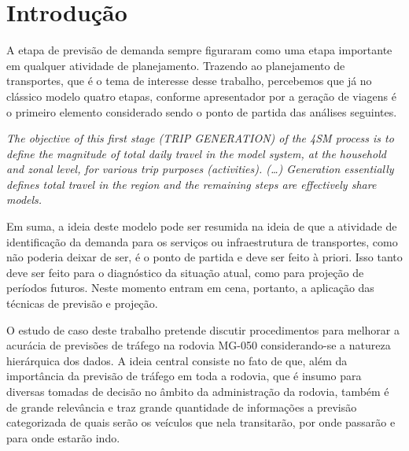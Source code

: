 \documentclass[
	12pt,				%
	openright,			%
	twoside,			%
	a4paper,			%
	english,			%
	french,				%
	spanish,			%
	brazil				%
	]{abntex2}
\begin{document}
\tableofcontents*
\cleardoublepage



\textual

\chapter*[Introdução]{Introdução}

A etapa de previsão de demanda sempre figuraram como uma etapa importante em qualquer atividade de planejamento.
Trazendo ao planejamento de transportes, que é o tema de interesse desse trabalho, percebemos que já no clássico modelo quatro etapas, conforme apresentador por  a geração de viagens é o primeiro elemento considerado sendo o ponto de partida das análises seguintes.

\begin{citacao}
\emph{The objective of this first stage (TRIP GENERATION) of the 4SM process is to define the magnitude of total daily travel in the model system, at the household and zonal level, for various trip purposes (activities). (…) Generation essentially defines total travel in the region and the remaining steps are effectively share models.} \cite{hensher_handbook_2007}
\end{citacao}
 
Em suma, a ideia deste modelo pode ser resumida na ideia de que a atividade de identificação da demanda para os serviços ou infraestrutura de transportes, como não poderia deixar de ser, é o ponto de partida e deve ser feito à priori. Isso tanto deve ser feito para o diagnóstico da situação atual, como para projeção de períodos futuros. Neste momento entram em cena, portanto, a aplicação das técnicas de previsão e projeção.

O estudo de caso deste trabalho pretende discutir procedimentos para melhorar a acurácia de previsões de tráfego na rodovia MG-050 considerando-se a natureza hierárquica dos dados. A ideia central consiste no fato de que, além da importância da previsão de tráfego em toda a rodovia, que é insumo para diversas tomadas de decisão no âmbito da administração da rodovia, também é de grande relevância e traz grande quantidade de informações a previsão categorizada de quais serão os veículos que nela transitarão, por onde passarão e para onde estarão indo.
\end{document}
